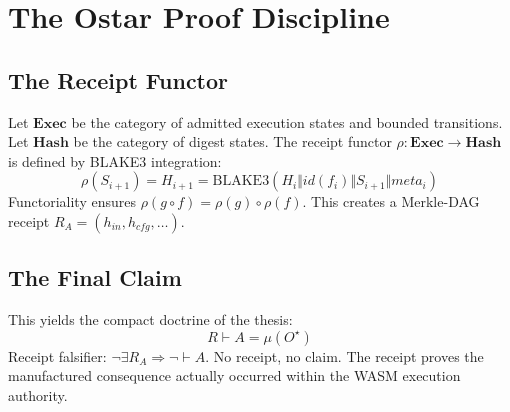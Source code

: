 
\chapter{The Ostar Proof Discipline}
\section{The Receipt Functor}
Let $\mathbf{Exec}$ be the category of admitted execution states and bounded transitions. Let $\mathbf{Hash}$ be the category of digest states. The receipt functor $\rho: \mathbf{Exec} \to \mathbf{Hash}$ is defined by BLAKE3 integration:
\begin{equation}
\rho(S_{i+1}) = H_{i+1} = \mathrm{BLAKE3}(H_i \Vert id(f_i) \Vert S_{i+1} \Vert meta_i)
\end{equation}
Functoriality ensures $\rho(g\circ f) = \rho(g)\circ\rho(f)$. This creates a Merkle-DAG receipt $R_A = (h_{in}, h_{cfg}, \dots)$.

\section{The Final Claim}
This yields the compact doctrine of the thesis:
\begin{equation}
\boxed{R \vdash A = \mu(O^{\star})}
\end{equation}
Receipt falsifier: $\neg \exists R_A \Rightarrow \neg \vdash A$. No receipt, no claim. The receipt proves the manufactured consequence actually occurred within the WASM execution authority.
